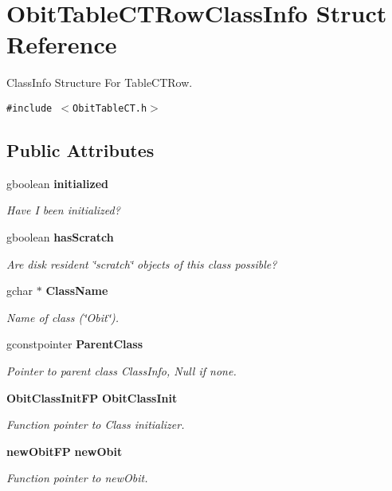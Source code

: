 \section{Obit\-Table\-CTRow\-Class\-Info Struct Reference}
\label{structObitTableCTRowClassInfo}
Class\-Info Structure For Table\-CTRow.  


{\tt \#include $<$Obit\-Table\-CT.h$>$}

\subsection*{Public Attributes}
\begin{CompactItemize}
\item 
gboolean {\bf initialized}
\begin{CompactList}\small\item\em Have I been initialized? \item\end{CompactList}\item 
gboolean {\bf has\-Scratch}
\begin{CompactList}\small\item\em Are disk resident \char`\"{}scratch\char`\"{} objects of this class possible? \item\end{CompactList}\item 
gchar $\ast$ {\bf Class\-Name}
\begin{CompactList}\small\item\em Name of class (\char`\"{}Obit\char`\"{}). \item\end{CompactList}\item 
gconstpointer {\bf Parent\-Class}
\begin{CompactList}\small\item\em Pointer to parent class Class\-Info, Null if none. \item\end{CompactList}\item 
{\bf Obit\-Class\-Init\-FP} {\bf Obit\-Class\-Init}
\begin{CompactList}\small\item\em Function pointer to Class initializer. \item\end{CompactList}\item 
{\bf new\-Obit\-FP} {\bf new\-Obit}
\begin{CompactList}\small\item\em Function pointer to new\-Obit. \item\end{CompactList}\item 

\end{CompactItemize}
